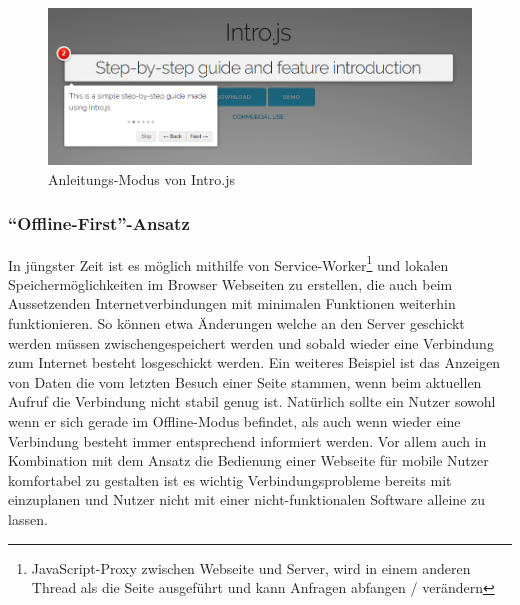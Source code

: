  \begin{figure}
    \centering
    \captionsetup{justification=centering}
    \includegraphics[width=\textwidth]{figures/intro_js_example.png}
        \caption{Anleitungs-Modus von Intro.js}\label{fig:intro_js_example}
\end{figure}

\subsubsection{``Offline-First''-Ansatz}
In jüngster Zeit ist es möglich mithilfe von Service-Worker\footnote{JavaScript-Proxy zwischen Webseite und Server, wird in einem anderen Thread als die Seite ausgeführt und kann Anfragen abfangen / verändern} und lokalen Speichermöglichkeiten im Browser Webseiten zu erstellen, die auch beim Aussetzenden Internetverbindungen mit minimalen Funktionen weiterhin funktionieren. So können etwa Änderungen welche an den Server geschickt werden müssen zwischengespeichert werden und sobald wieder eine Verbindung zum Internet besteht losgeschickt werden. Ein weiteres Beispiel ist das Anzeigen von Daten die vom letzten Besuch einer Seite stammen, wenn beim aktuellen Aufruf die Verbindung nicht stabil genug ist. Natürlich sollte ein Nutzer sowohl wenn er sich gerade im Offline-Modus befindet, als auch wenn wieder eine Verbindung besteht immer entsprechend informiert werden.
Vor allem auch in Kombination mit dem Ansatz die Bedienung einer Webseite für mobile Nutzer komfortabel zu gestalten ist es wichtig Verbindungsprobleme bereits mit einzuplanen und Nutzer nicht mit einer nicht-funktionalen Software alleine zu lassen.

